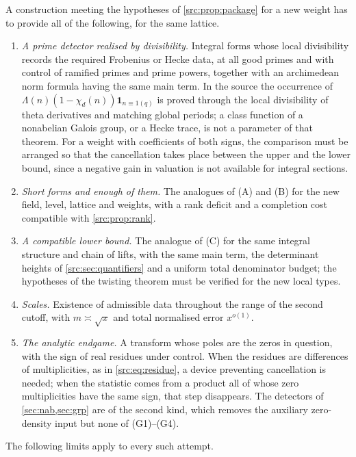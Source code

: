 A construction meeting the hypotheses of \cref{src:prop:package} for a new weight has to
provide all of the following, for the same lattice.
\begin{enumerate}[label=\textup{(G\arabic*)}]
\item \emph{A prime detector realised by divisibility.} Integral forms whose local
divisibility records the required Frobenius or Hecke data, at all good primes and with control
of ramified primes and prime powers, together with an archimedean norm formula having the
same main term. In the source the occurrence of $\Lambda(n)(1-\chi_d(n))\mathbf 1_{n\equiv1(q)}$
is proved through the local divisibility of theta derivatives and matching global periods; a
class function of a nonabelian Galois group, or a Hecke trace, is not a parameter of that
theorem. For a weight with coefficients of both signs, the comparison must be arranged so
that the cancellation takes place between the upper and the lower bound, since a negative
gain in valuation is not available for integral sections.
\item \emph{Short forms and enough of them.} The analogues of (A) and (B) for the new field,
level, lattice and weights, with a rank deficit and a completion cost compatible with
\cref{src:prop:rank}.
\item \emph{A compatible lower bound.} The analogue of (C) for the same integral structure and
chain of lifts, with the same main term, the determinant heights of
\cref{src:sec:quantifiers} and a uniform total denominator budget; the hypotheses of the
twisting theorem must be verified for the new local types.
\item \emph{Scales.} Existence of admissible data throughout the range of the second cutoff,
with $m\asymp\sqrt x$ and total normalised error $x^{o(1)}$.
\item \emph{The analytic endgame.} A transform whose poles are the zeros in question, with
the sign of real residues under control. When the residues are differences of multiplicities,
as in \eqref{src:eq:residue}, a device preventing cancellation is needed; when the statistic
comes from a product all of whose zero multiplicities have the same sign, that step
disappears. The detectors of \cref{sec:nab,sec:grp} are of the second kind, which removes the
auxiliary zero-density input but none of (G1)--(G4).
\end{enumerate}

The following limits apply to every such attempt.

